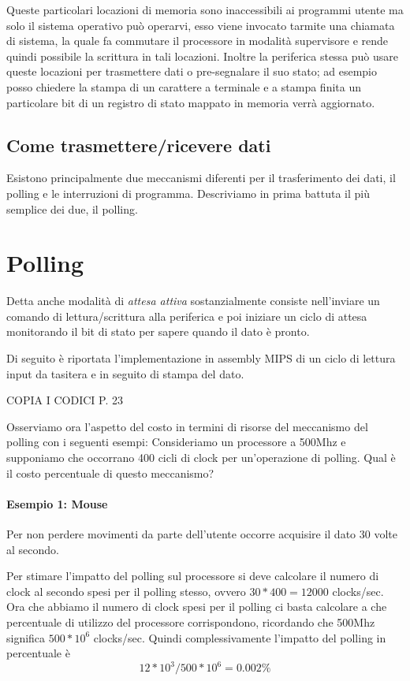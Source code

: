\documentclass[class=book, crop=false, oneside]{standalone}
\begin{document}
Queste particolari locazioni di memoria sono inaccessibili ai programmi utente ma solo il sistema operativo può operarvi, esso viene invocato tarmite una chiamata di sistema, la quale fa commutare il processore in modalità supervisore e rende quindi possibile la scrittura in tali locazioni.
Inoltre la periferica stessa può usare queste locazioni per trasmettere dati o pre-segnalare il suo stato; ad esempio posso chiedere la stampa di un carattere a terminale e a stampa finita un particolare bit di un registro di stato mappato in memoria verrà aggiornato.

\subsection{Come trasmettere/ricevere dati}
Esistono principalmente due meccanismi diferenti per il trasferimento dei dati, il polling e le interruzioni di programma.
Descriviamo in prima battuta il più semplice dei due, il polling.

\section{Polling}
Detta anche modalità di \emph{attesa attiva} sostanzialmente consiste nell'inviare un comando di lettura/scrittura alla periferica e poi iniziare un ciclo di attesa monitorando il bit di stato per sapere quando il dato è pronto.

Di seguito è riportata l'implementazione in assembly MIPS di un ciclo di lettura input da tasitera e in seguito di stampa del dato.

COPIA I CODICI P. 23

Osserviamo ora l'aspetto del costo in termini di risorse del meccanismo del polling con i seguenti esempi:
Consideriamo un processore a 500Mhz e supponiamo che occorrano 400 cicli di clock per un’operazione di polling. Qual è il costo percentuale di questo meccanismo?

\paragraph{Esempio 1: Mouse} Per non perdere movimenti da parte dell’utente occorre acquisire il dato 30 volte al secondo.

Per stimare l'impatto del polling sul processore si deve calcolare il numero di clock al secondo spesi per il polling stesso, ovvero \(30*400 = 12000\) clocks/sec.
Ora che abbiamo il numero di clock spesi per il polling ci basta calcolare a che percentuale di utilizzo del processore corrispondono, ricordando che 500Mhz significa \(500*10^{6}\) clocks/sec.
Quindi complessivamente l'impatto del polling in percentuale è \[12*10^{3}/500*10^{6}=0.002\%\]
\end{document}

